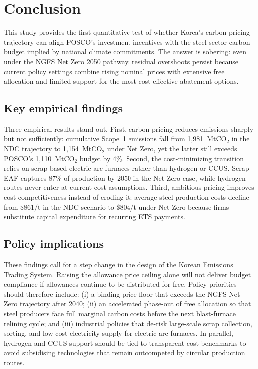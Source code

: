 \documentclass[preprint,1p,authoryear]{elsarticle}
\begin{document}
\section{Conclusion}

This study provides the first quantitative test of whether Korea's carbon pricing trajectory can align POSCO's investment incentives with the steel-sector carbon budget implied by national climate commitments. The answer is sobering: even under the NGFS Net Zero 2050 pathway, residual overshoots persist because current policy settings combine rising nominal prices with extensive free allocation and limited support for the most cost-effective abatement options.

\subsection{Key empirical findings}

Three empirical results stand out. First, carbon pricing reduces emissions sharply but not sufficiently: cumulative Scope~1 emissions fall from 1{,}981~MtCO$_2$ in the NDC trajectory to 1{,}154~MtCO$_2$ under Net Zero, yet the latter still exceeds POSCO's 1{,}110~MtCO$_2$ budget by 4\%. Second, the cost-minimizing transition relies on scrap-based electric arc furnaces rather than hydrogen or CCUS. Scrap-EAF captures 87\% of production by 2050 in the Net Zero case, while hydrogen routes never enter at current cost assumptions. Third, ambitious pricing improves cost competitiveness instead of eroding it: average steel production costs decline from \$861/t in the NDC scenario to \$804/t under Net Zero because firms substitute capital expenditure for recurring ETS payments.

\subsection{Policy implications}

These findings call for a step change in the design of the Korean Emissions Trading System. Raising the allowance price ceiling alone will not deliver budget compliance if allowances continue to be distributed for free. Policy priorities should therefore include: (i) a binding price floor that exceeds the NGFS Net Zero trajectory after 2040; (ii) an accelerated phase-out of free allocation so that steel producers face full marginal carbon costs before the next blast-furnace relining cycle; and (iii) industrial policies that de-risk large-scale scrap collection, sorting, and low-cost electricity supply for electric arc furnaces. In parallel, hydrogen and CCUS support should be tied to transparent cost benchmarks to avoid subsidising technologies that remain outcompeted by circular production routes.
\end{document}
